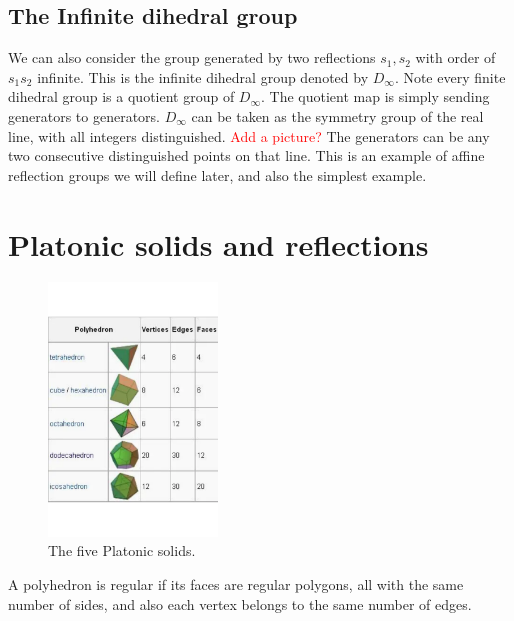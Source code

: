 \documentclass[../main.tex]{subfiles}
\begin{document}
\subsection{The Infinite dihedral group}

We can also consider the group generated by two reflections $s_1,s_2$ with order of $s_1s_2$ infinite. This is the infinite dihedral group denoted by $D_{\infty}$. Note every finite dihedral group is a quotient group of $D_{\infty}$. The quotient map is simply sending generators to generators. $D_{\infty}$ can be taken as the symmetry group of the real line, with all integers distinguished. \textcolor{red}{Add a picture?} 
The generators can be any two consecutive distinguished points on that line. This is an example of affine reflection groups we will define later, and also the simplest example. 






\section{Platonic solids and reflections}
\begin{figure}[ht]
    \centering
    \includegraphics[width=0.4\textwidth]{platonic solids.pdf}
    \caption{The five Platonic solids.}
    \label{platonic solids}
\end{figure}

\begin{definition}
    A polyhedron is regular if its faces are regular polygons, all with the same number of sides, and also each vertex belongs to the same number of edges.
\end{definition}
\end{document}
